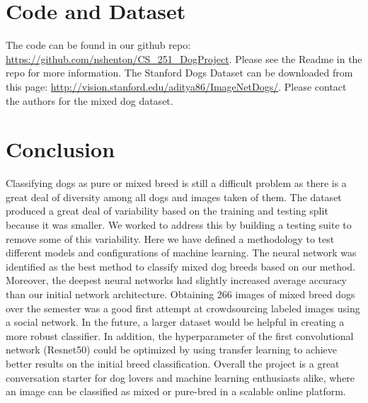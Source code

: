 \documentclass[12pt]{article}
\begin{document}
\section{Code and Dataset}

The code can be found in our github repo: \url{https://github.com/nshenton/CS_251_DogProject}. Please see the Readme in the repo for more information. The Stanford Dogs Dataset can be downloaded from this page: \url{http://vision.stanford.edu/aditya86/ImageNetDogs/}. Please contact the authors for the mixed dog dataset.

\section{Conclusion}

Classifying dogs as pure or mixed breed is still a difficult problem as there is a great deal of diversity among all dogs and images taken of them. The dataset produced a great deal of variability based on the training and testing split because it was smaller. We worked to address this by building a testing suite to remove some of this variability. Here we have defined a methodology to test different models and configurations of machine learning. The neural network was identified as the best method to classify mixed dog breeds based on our method. Moreover, the deepest neural networks had slightly increased average accuracy than our initial network architecture. Obtaining 266 images of mixed breed dogs over the semester was a good first attempt at crowdsourcing labeled images using a social network. In the future, a larger dataset would be helpful in creating a more robust classifier. In addition, the hyperparameter of the first convolutional network (Resnet50) could be optimized by using transfer learning to achieve better results on the initial breed classification. Overall the project is a great conversation starter for dog lovers and machine learning enthusiasts alike, where an image can be classified as mixed or pure-bred in a scalable online platform. 

\nocite{*}
{}

\end{document}
